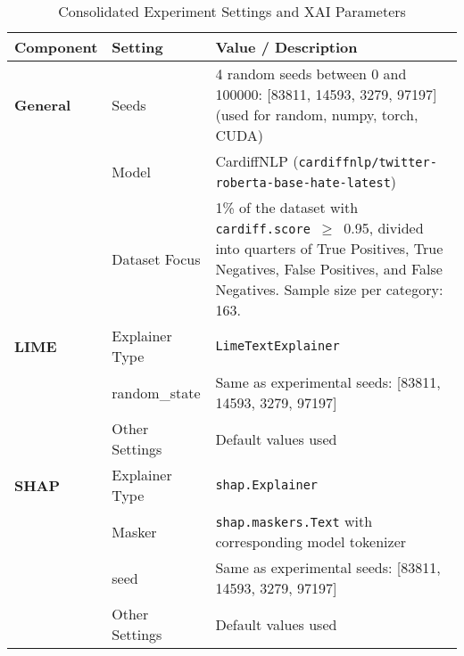 \documentclass{article}
\begin{document}
\begin{table}[ht]
\centering
\caption{Consolidated Experiment Settings and XAI Parameters}
\label{tab:combined_experiment_settings}
\begin{tabular}{llp{10cm}}
\toprule
\textbf{Component} & \textbf{Setting} & \textbf{Value / Description} \\
\midrule
\textbf{General} 
& Seeds & 4 random seeds between 0 and 100000: [83811, 14593, 3279, 97197] (used for random, numpy, torch, CUDA) \\
& Model & CardiffNLP (\texttt{cardiffnlp/twitter-roberta-base-hate-latest}) \\
& Dataset Focus & 1\% of the dataset with \texttt{cardiff.score}~$\geq$~0.95, divided into quarters of True Positives, True Negatives, False Positives, and False Negatives. Sample size per category: 163. \\
\addlinespace
\textbf{LIME} 
& Explainer Type & \texttt{LimeTextExplainer} \\
& random\_state & Same as experimental seeds: [83811, 14593, 3279, 97197] \\
& Other Settings & Default values used \\
\addlinespace
\textbf{SHAP} 
& Explainer Type & \texttt{shap.Explainer} \\
& Masker & \texttt{shap.maskers.Text} with corresponding model tokenizer \\
& seed & Same as experimental seeds: [83811, 14593, 3279, 97197] \\
& Other Settings & Default values used \\
\bottomrule
\end{tabular}
\end{table}
\end{document}
